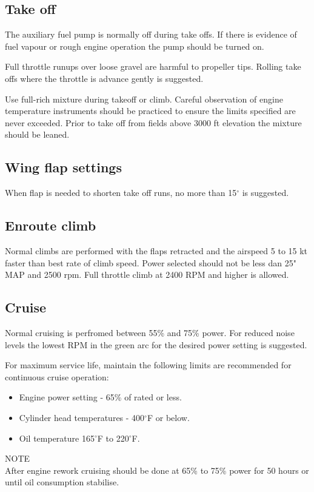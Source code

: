 \subsection{Take off}
The auxiliary fuel pump is normally off during take offs.  If there is evidence of fuel vapour or rough engine operation the pump should be turned on.

Full throttle runups over loose gravel are harmful to propeller tips.  Rolling take offs where the throttle is advance gently is suggested.  

Use full-rich mixture during takeoff or climb. Careful observation of engine temperature instruments should be practiced to ensure the limits specified are never exceeded.
Prior to take off from fields above 3000 ft elevation the mixture should be leaned.


\subsection{Wing flap settings}
When flap is needed to shorten take off runs, no more than 15$^{\circ}$ is suggested.

\subsection{Enroute climb}
Normal climbs are performed with the flaps retracted and the airspeed 5 to 15 kt faster than best rate of climb speed.  Power selected should not be less dan 25" MAP and 2500 rpm. Full throttle climb at 2400 RPM and higher is allowed. 

\subsection{Cruise}
Normal cruising is perfromed between 55\% and 75\% power.  
For reduced noise levels the lowest RPM in the green arc for the desired power setting is suggested.

For maximum service life, maintain the following limits are recommended for continuous cruise operation:\\
\begin{itemize}
\item Engine power setting - 65\% of rated or less.
\item Cylinder head temperatures - 400$^{\circ}$F or below.
\item Oil temperature 165$^{\circ}$F to 220$^{\circ}$F.
\end{itemize}
\begin{center}
NOTE\\

After engine rework cruising should be done at 65\% to 75\% power for 50 hours or until oil consumption stabilise.
\end{center}

